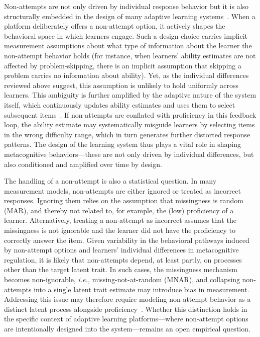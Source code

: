 \documentclass[11pt]{article}
\begin{document}
Non-attempts are not only driven by individual response behavior but it is also structurally embedded in the design of many adaptive learning systems~\parencite{corbett1995knowledge, aleven2000limitations, vanlehn2011relative, roll2015understanding}. When a platform deliberately offers a non-attempt option, it actively shapes the behavioral space in which learners engage. Such a design choice carries implicit measurement assumptions about what type of information about the learner the non-attempt behavior holds (for instance, when learners' ability estimates are not affected by problem-skipping, there is an implicit assumption that skipping a problem carries no information about ability). Yet, as the individual differences reviewed above suggest, this assumption is unlikely to hold uniformly across learners. This ambiguity is further amplified by the adaptive nature of the system itself, which continuously updates ability estimates and uses them to select subsequent items~\parencite{van2010elements}. If non-attempts are conflated with proficiency in this feedback loop, the ability estimate may systematically misguide learners by selecting items in the wrong difficulty range, which in turn generates further distorted response patterns. 
The design of the learning system thus plays a vital role in shaping metacognitive behaviors---these are not only driven by individual differences, but also conditioned and amplified over time by design. %

The handling of a non-attempt is also a statistical question. In many measurement models, non-attempts are either ignored or treated as incorrect responses. Ignoring them relies on the assumption that missingness is random (MAR), and thereby not related to, for example, the (low) proficiency of a learner. Alternatively, treating a non-attempt as incorrect assumes that the missingness is not ignorable and the learner did not have the proficiency to correctly answer the item. Given variability in the behavioral pathways induced by non-attempt options and learners’ individual differences in metacognitive regulation, it is likely that non-attempts depend, at least partly, on processes other than the target latent trait. In such cases, the missingness mechanism becomes non-ignorable, \textit{i.e.,} missing-not-at-random (MNAR), and collapsing non-attempts into a single latent trait estimate may introduce bias in measurement. Addressing this issue may therefore require modeling non-attempt behavior as a distinct latent process alongside proficiency~\parencite{little2019statistical}. Whether this distinction holds in the specific context of adaptive learning platforms---where non-attempt options are intentionally designed into the system---remains an open empirical question.
\end{document}
